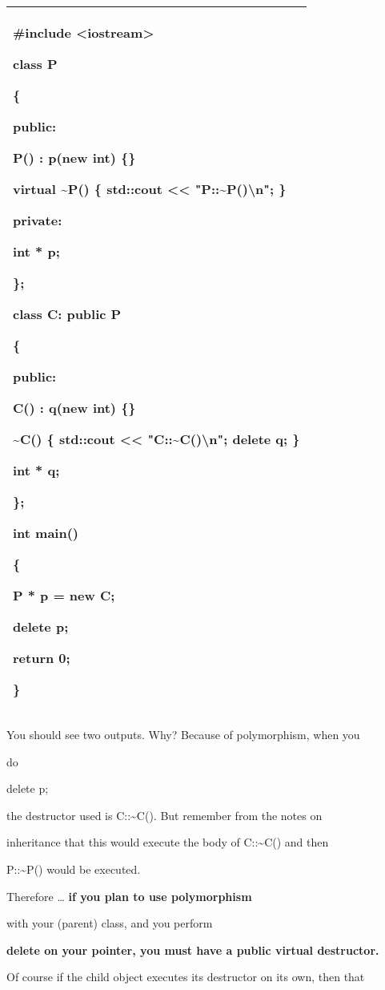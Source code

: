 \documentclass[
]{article}
\begin{document}
\begin{longtable}[]{@{}l@{}}
\toprule
\endhead
\begin{minipage}[t]{0.97\columnwidth}\raggedright
\#include \textless iostream\textgreater{}

class P

\{

public:

P() : p(new int) \{\}

\textbf{ virtual }\textasciitilde P() \{ std::cout \textless\textless{}
"P::\textasciitilde P()\textbackslash n"; \}

private:

int * p;

\};

class C: public P

\{

public:

C() : q(new int) \{\}

\textasciitilde C() \{ std::cout \textless\textless{}
"C::\textasciitilde C()\textbackslash n"; delete q; \}

int * q;

\};

int main()

\{

P * p = new C;

delete p;

return 0;

\}\strut
\end{minipage}\tabularnewline
\bottomrule
\end{longtable}

You should see two outputs. Why? Because of polymorphism, when you

do

delete p;

the destructor used is C::\textasciitilde C(). But remember from the
notes on

inheritance that this would execute the body of C::\textasciitilde C()
and then

P::\textasciitilde P() would be executed.

Therefore \ldots{} \textbf{if you plan to use polymorphism}

with your (parent) class, and you perform

\textbf{delete on your pointer, you must have a public virtual
destructor.}

Of course if the child object executes its destructor on its own, then
that
\end{document}
